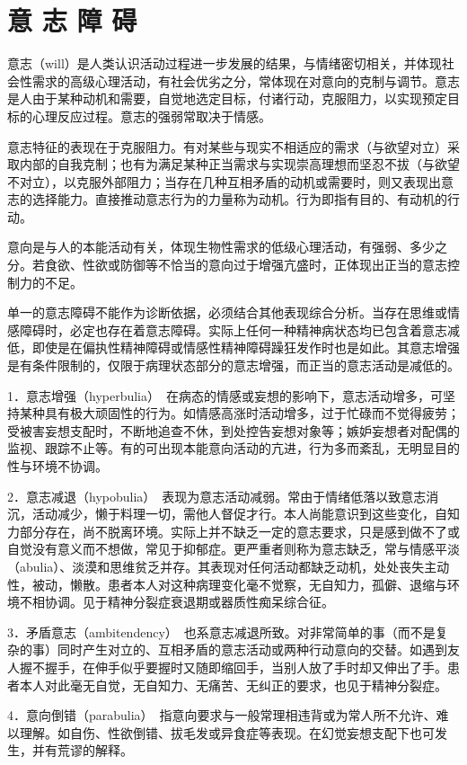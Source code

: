 \section{意 志 障 碍}

意志（will）是人类认识活动过程进一步发展的结果，与情绪密切相关，并体现社会性需求的高级心理活动，有社会优劣之分，常体现在对意向的克制与调节。意志是人由于某种动机和需要，自觉地选定目标，付诸行动，克服阻力，以实现预定目标的心理反应过程。意志的强弱常取决于情感。

意志特征的表现在于克服阻力。有对某些与现实不相适应的需求（与欲望对立）采取内部的自我克制；也有为满足某种正当需求与实现崇高理想而坚忍不拔（与欲望不对立），以克服外部阻力；当存在几种互相矛盾的动机或需要时，则又表现出意志的选择能力。直接推动意志行为的力量称为动机。行为即指有目的、有动机的行动。

意向是与人的本能活动有关，体现生物性需求的低级心理活动，有强弱、多少之分。若食欲、性欲或防御等不恰当的意向过于增强亢盛时，正体现出正当的意志控制力的不足。

单一的意志障碍不能作为诊断依据，必须结合其他表现综合分析。当存在思维或情感障碍时，必定也存在着意志障碍。实际上任何一种精神病状态均已包含着意志减低，即使是在偏执性精神障碍或情感性精神障碍躁狂发作时也是如此。其意志增强是有条件限制的，仅限于病理状态部分的意志增强，而正当的意志活动是减低的。

1．意志增强（hyperbulia）　在病态的情感或妄想的影响下，意志活动增多，可坚持某种具有极大顽固性的行为。如情感高涨时活动增多，过于忙碌而不觉得疲劳；受被害妄想支配时，不断地追查不休，到处控告妄想对象等；嫉妒妄想者对配偶的监视、跟踪不止等。有的可出现本能意向活动的亢进，行为多而紊乱，无明显目的性与环境不协调。

2．意志减退（hypobulia）　表现为意志活动减弱。常由于情绪低落以致意志消沉，活动减少，懒于料理一切，需他人督促才行。本人尚能意识到这些变化，自知力部分存在，尚不脱离环境。实际上并不缺乏一定的意志要求，只是感到做不了或自觉没有意义而不想做，常见于抑郁症。更严重者则称为意志缺乏，常与情感平淡（abulia）、淡漠和思维贫乏并存。其表现对任何活动都缺乏动机，处处丧失主动性，被动，懒散。患者本人对这种病理变化毫不觉察，无自知力，孤僻、退缩与环境不相协调。见于精神分裂症衰退期或器质性痴呆综合征。

3．矛盾意志（ambitendency）　也系意志减退所致。对非常简单的事（而不是复杂的事）同时产生对立的、互相矛盾的意志活动或两种行动意向的交替。如遇到友人握不握手，在伸手似乎要握时又随即缩回手，当别人放了手时却又伸出了手。患者本人对此毫无自觉，无自知力、无痛苦、无纠正的要求，也见于精神分裂症。

4．意向倒错（parabulia）　指意向要求与一般常理相违背或为常人所不允许、难以理解。如自伤、性欲倒错、拔毛发或异食症等表现。在幻觉妄想支配下也可发生，并有荒谬的解释。

